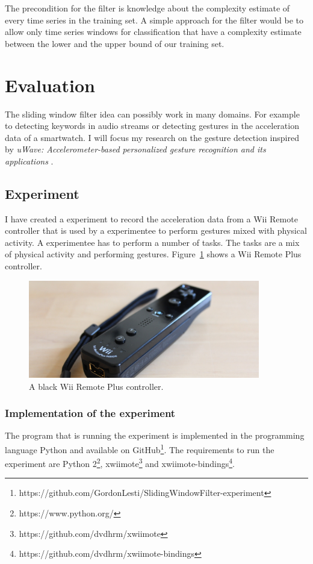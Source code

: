 \documentclass[runningheads,a4paper]{llncs}
\begin{document}
    The precondition for the filter is knowledge about the complexity estimate of every time series in the training set.
    A simple approach for the filter would be to allow only time series windows for classification that have a
    complexity estimate between the lower and the upper bound of our training set.

    \section{Evaluation}
    The sliding window filter idea can possibly work in many domains. For example to detecting keywords in audio
    streams or detecting gestures in the acceleration data of a smartwatch. I will focus my research on the gesture
    detection inspired by
    \textit{uWave: Accelerometer-based personalized gesture recognition and its applications} \cite{liu2009uwave}.

    \subsection{Experiment}
    I have created a experiment to record the acceleration data from a Wii Remote controller that is used by a
    experimentee to perform gestures mixed with physical activity. A experimentee has to perform a number of tasks. The
    tasks are a mix of physical activity and performing gestures. Figure~\ref{fig:wii-remote} shows a Wii Remote Plus
    controller.

    \begin{figure}
        \centering
        \includegraphics[width=0.9\textwidth]{wii-remote-plus.jpg}
        \caption{A black Wii Remote Plus controller.}
        \label{fig:wii-remote}
    \end{figure}

    \subsubsection{Implementation of the experiment}
    The program that is running the experiment is implemented in the programming language Python and available on
    GitHub\footnote{https://github.com/GordonLesti/SlidingWindowFilter-experiment}. The requirements to run the
    experiment are Python 2\footnote{https://www.python.org/}, xwiimote\footnote{https://github.com/dvdhrm/xwiimote} and
    xwiimote-bindings\footnote{https://github.com/dvdhrm/xwiimote-bindings}.
\end{document}
